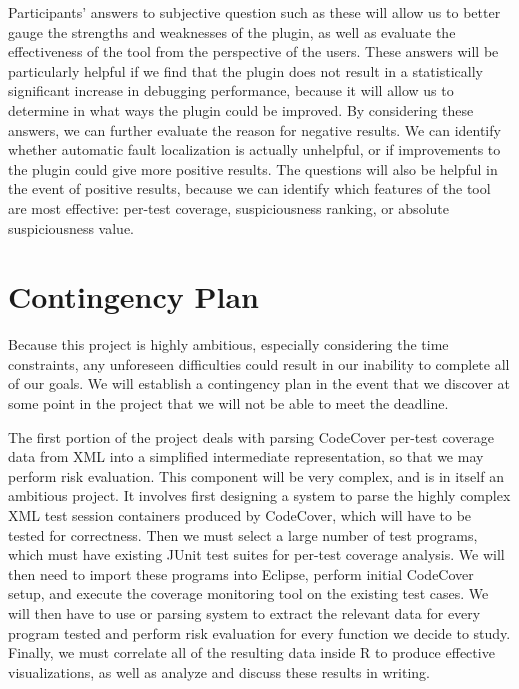 Participants' answers to subjective question such as these will allow us to better
gauge the strengths and weaknesses of the plugin, as well as evaluate the effectiveness
of the tool from the perspective of the users.  These answers will be particularly helpful
if we find that the plugin does not result in a statistically significant increase in 
debugging performance, because it will allow us to determine in what ways the plugin 
could be improved.  By considering these answers, we can further evaluate the
reason for negative results.  We can identify whether automatic fault localization is
actually unhelpful, or if improvements to the plugin could give more positive results.
The questions will also be helpful in the event of positive results, because we can
identify which features of the tool are most effective: per-test coverage, suspiciousness
ranking, or absolute suspiciousness value.

\section{Contingency Plan}\label{sec:addcont}

Because this project is highly ambitious, especially considering the time constraints, 
any unforeseen difficulties could result in our inability to complete all of our goals.
We will establish a contingency plan in the event that we discover at some point
in the project that we will not be able to meet the deadline.

The first portion of the project deals with parsing CodeCover per-test coverage data
from XML into a simplified intermediate representation, so that we may perform risk
evaluation.  This component will be very complex, and is in itself an ambitious project.
It involves first designing a system to parse the highly complex XML test session
containers produced by CodeCover, which will have to be tested for correctness.  Then 
we must select a large number of test programs, which must have existing JUnit test
suites for per-test coverage analysis.  We will then need to import these programs into
Eclipse, perform initial CodeCover setup, and execute the coverage monitoring tool on 
the existing test cases.  We will then have to use or parsing system to extract the 
relevant data for every program tested and perform risk evaluation for every function
we decide to study.  Finally, we must correlate all of the resulting data inside R
to produce effective visualizations, as well as analyze and discuss these results in
writing.  


